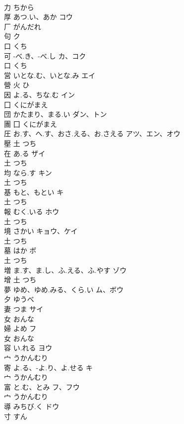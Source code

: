 \documentclass[8pt]{extreport}
\begin{document}
\begin{CJK}{UTF8}{min}
\\	力		ちから		
\\	厚	あつ.い、あか	コウ	
\\	厂		がんだれ		
\\	句		ク	
\\	口		くち		
\\	可	-べ.き、-べ.し	カ、コク	
\\	口		くち		
\\	営	いとな.む、いとな.み	エイ	
\\	營	火		ひ		
\\	因	よ.る、ちな.む	イン	
\\	囗		くにがまえ		
\\	団	かたまり、まる.い	ダン、トン	
\\	團	囗		くにがまえ		
\\	圧	お.す、へ.す、おさ.える、お.さえる	アツ、エン、オウ	
\\	壓	土		つち		
\\	在	あ.る	ザイ	
\\	土		つち		
\\	均	なら.す	キン	
\\	土		つち		
\\	基	もと、もとい	キ	
\\	土		つち		
\\	報	むく.いる	ホウ	
\\	土		つち		
\\	境	さかい	キョウ、ケイ	
\\	土		つち		
\\	墓	はか	ボ	
\\	土		つち		
\\	増	ま.す、ま.し、ふ.える、ふ.やす	ゾウ	
\\	增	土		つち		
\\	夢	ゆめ、ゆめ.みる、くら.い	ム、ボウ	
\\	夕		ゆうべ		
\\	妻	つま	サイ	
\\	女		おんな		
\\	婦	よめ	フ	
\\	女		おんな		
\\	容	い.れる	ヨウ	
\\	宀		うかんむり		
\\	寄	よ.る、-よ.り、よ.せる	キ	
\\	宀		うかんむり		
\\	富	と.む、とみ	フ、フウ	
\\	宀		うかんむり		
\\	導	みちび.く	ドウ	
\\	寸		すん		

\end{CJK}
\end{document}
